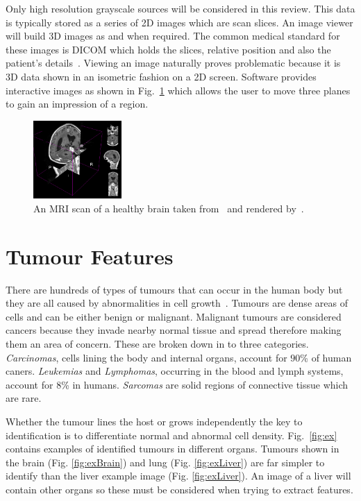 \documentclass[journal]{IEEEtran}
\begin{document}
Only high resolution grayscale sources will be considered in this review.
This data is typically stored as a series of 2D images which are scan slices.
An image viewer will build 3D images as and when required.
The common medical standard for these images is DICOM which holds the slices, relative position and also the patient's details~\cite{dicom11nema}.
Viewing an image naturally proves problematic because it is 3D data shown in an isometric fashion on a 2D screen.
Software provides interactive images as shown in Fig.~\ref{fig:3d} which allows the user to move three planes to gain an impression of a region.

\begin{figure}[!htb]
   \centering
   \includegraphics[width = 0.3\textwidth]{Figures/3Dview.png}
   \caption{An MRI scan of a healthy brain taken from~\cite{cia} and rendered by~\cite{slicer}.}
   \label{fig:3d}
\end{figure}












\section{Tumour Features}
\label{sec:tumour}

There are hundreds of types of tumours that can occur in the human body but they are all caused by abnormalities in cell growth~\cite{cooper1992cancer}.
Tumours are dense areas of cells and can be either benign or malignant.
Malignant tumours are considered cancers because they invade nearby normal tissue and spread therefore making them an area of concern.
These are broken down in to three categories.
\emph{Carcinomas}, cells lining the body and internal organs, account for $90$\% of human caners.
\emph{Leukemias} and \emph{Lymphomas}, occurring in the blood and lymph systems, account for $8$\% in humans.
\emph{Sarcomas} are solid regions of connective tissue which are rare.


Whether the tumour lines the host or grows independently the key to identification is to differentiate normal and abnormal cell density. 
Fig.~\ref{fig:ex} contains examples of identified tumours in different organs.
Tumours shown in the brain (Fig. \ref{fig:exBrain}) and lung (Fig. \ref{fig:exLiver}) are far simpler to identify than the liver example image (Fig. \ref{fig:exLiver}).
An image of a liver will contain other organs so these must be considered when trying to extract features.
\end{document}
